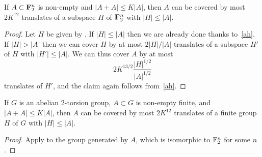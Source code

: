 \begin{theorem}[PFR]\label{pfr}
\leanok
If $A \subset {\bf F}_2^n$ is non-empty and $|A+A| \leq K|A|$, then $A$ can be covered by most $2K^{12}$ translates of a subspace $H$ of ${\bf F}_2^n$ with $|H| \leq |A|$.
\end{theorem}

\begin{proof}
  \leanok
  Let $H$ be given by .
  If $|H| \leq |A|$ then we are already done thanks to~\eqref{ah}.  If $|H| > |A|$ then we can cover $H$ by at most $2 |H|/|A|$ translates of a subspace $H'$ of $H$ with $|H'| \leq |A|$.  We can thus cover $A$ by at most
  \[2K^{13/2} \frac{|H|^{1/2}}{|A|^{1/2}}\]
  translates of $H'$, and the claim again follows from~\eqref{ah}.
\end{proof}

\begin{corollary}\label{pfr-cor}
  \leanok
  If $G$ is an abelian $2$-torsion group, $A \subset G$ is non-empty finite, and $|A+A| \leq K|A|
  $, then $A$ can be covered by most $2K^{12}$ translates of a finite group  $H$ of $G$ with $|H| \leq |A|$.
  \end{corollary}

\begin{proof}\leanok  Apply  to the group generated by $A$, which is isomorphic to $\mathbb{F}_2^n$ for some $n$.
\end{proof}

